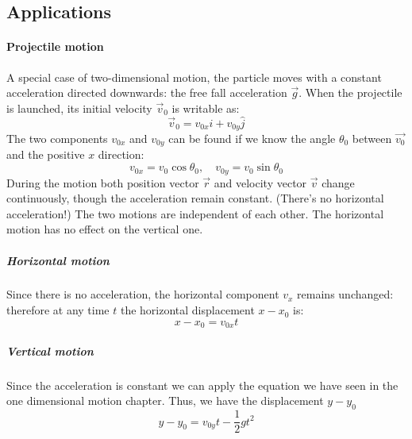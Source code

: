 \subsection{Applications}
\paragraph{Projectile motion} A special case of two-dimensional motion, the particle moves with a constant acceleration directed downwards: the free fall acceleration $\vec{g}$. When the projectile is launched, its initial velocity $\vec{v}_0$ is writable as: 
\begin{equation}
\vec{v}_0 = v_{0x} \hat{i} + v_{0y} \hat{j}
\end{equation}
The two components $v_{0x}$ and $v_{0y}$ can be found if we know the angle $\theta_0$ between $\vec{v_0}$ and the positive $x$ direction:
\begin{equation}
v_{0x} = v_0 \cos \theta_0,\quad v_{0y} = v_0\sin\theta_0
\end{equation}
During the motion both position vector $\vec{r}$ and velocity vector $\vec{v}$ change continuously, though the acceleration remain constant. (There's no horizontal acceleration!)
The two motions are independent of each other. The horizontal motion has no effect on the vertical one.

\subparagraph{Horizontal motion} Since there is no acceleration, the horizontal component $v_x$ remains unchanged: therefore at any time $t$ the horizontal displacement $x - x_0$ is:
\begin{equation}\label{eq:hor_motion}
x - x_0 = v_{0x}t
\end{equation}

\subparagraph{Vertical motion} Since the acceleration is constant we can apply the equation we have seen in the one dimensional motion chapter. Thus, we have the displacement $y- y_0$
\begin{equation}\label{eq:ver_motion}
y - y_0 = v_{0y}t - \frac{1}{2}gt^2
\end{equation}

